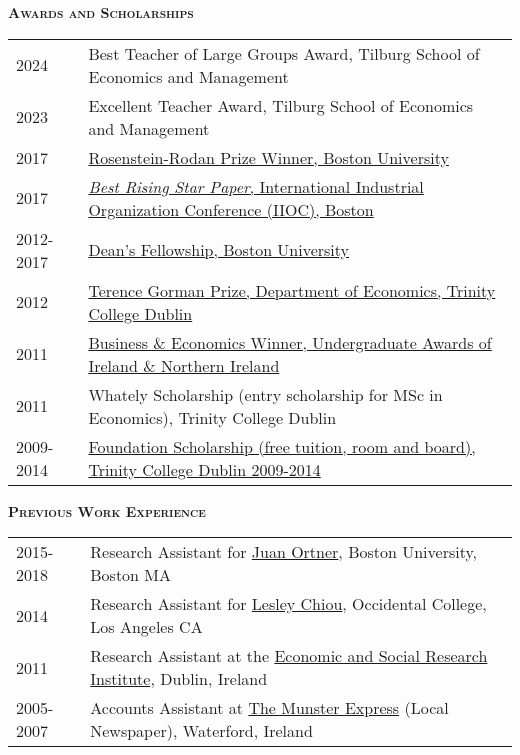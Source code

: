 \documentclass[11pt,overlapped,line,letterpaper]{article}
\newcommand{\cvsec}[1]{\vspace{\baselineskip}\textbf{\textsc{#1}}}
\begin{document}


\cvsec{Awards and Scholarships}\smallskip \\
\begin{tabularx}{\textwidth}{lX}
  2024 & Best Teacher of Large Groups Award, Tilburg School of Economics and Management \\
  2023 & Excellent Teacher Award, Tilburg School of Economics and Management \\
  2017 & \href{https://www.bu.edu/econ/research/ied/rosenstein-rodan-prize-winners/}{Rosenstein-Rodan Prize Winner, Boston University} \\
  2017 & \href{https://www.indorgsociety.org/rising-star-prize}{\emph{Best Rising Star Paper}, International Industrial Organization Conference (IIOC), Boston} \\
2012-2017 & \href{https://www.bu.edu/cas/admissions/phd-mfa/fellowship-aid/aid-for-phd-students/}{Dean's Fellowship, Boston University} \\
  2012 & \href{https://www.tcd.ie/Economics/postgraduate/msc-economics/awards/}{Terence Gorman Prize, Department of Economics, Trinity College Dublin} \\
  2011 & \href{https://www.tcd.ie/news_events/articles/trinity-students-excel-at-2011-undergraduate-awards-of-ireland/}{Business \& Economics Winner, Undergraduate Awards of Ireland \& Northern Ireland} \\
  2011 & Whately Scholarship (entry scholarship for MSc in Economics), Trinity College Dublin \\
  2009-2014 & \href{https://www.tcd.ie/academicregistry/exams/scholarship/}{Foundation Scholarship (free tuition, room and board), Trinity College Dublin 2009-2014} \\
\end{tabularx}

\cvsec{Previous Work Experience}\smallskip \\
\begin{tabularx}{\textwidth}{lX}
  2015-2018    & Research Assistant for \href{https://people.bu.edu/jortner/}{Juan Ortner}, Boston University, Boston MA \\
  2014  & Research Assistant for \href{https://www.oxy.edu/academics/faculty/lesley-chiou}{Lesley Chiou}, Occidental College, Los Angeles CA \\
2011  & Research Assistant at the \href{https://www.esri.ie/}{Economic and Social Research Institute}, Dublin, Ireland \\
2005-2007 & Accounts Assistant at \href{https://www.munster-express.ie/}{The Munster Express} (Local Newspaper), Waterford, Ireland
\end{tabularx}
\end{document}
